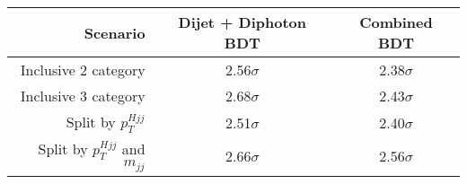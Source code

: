 \begin{tabular}{ r | c | c }
\hline
Scenario                          & Dijet + Diphoton BDT    & Combined BDT   \\
\hline
Inclusive 2 category              & 2.56$\sigma$            & 2.38$\sigma$   \\
Inclusive 3 category              & 2.68$\sigma$            & 2.43$\sigma$   \\
Split by $p_T^{Hjj}$              & 2.51$\sigma$            & 2.40$\sigma$   \\
Split by $p_T^{Hjj}$ and $m_{jj}$ & 2.66$\sigma$            & 2.56$\sigma$   \\
\hline
\end{tabular}
